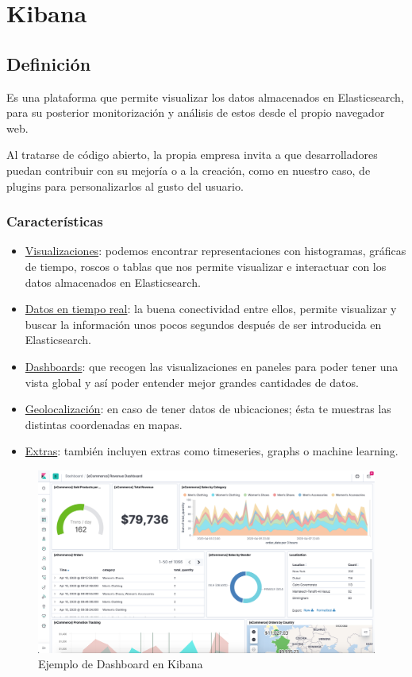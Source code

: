 \documentclass[a4paper, 12pt]{book}
\begin{document}
\section{Kibana}
\label{sec:Kibana}
\subsection{Definición}
Es una plataforma que permite visualizar los datos almacenados en Elasticsearch, para su posterior monitorización y análisis de estos desde el propio navegador web\cite{srivastaba:_kibanaguide}.

Al tratarse de código abierto, la propia empresa invita a que desarrolladores puedan contribuir con su mejoría o a la creación, como en nuestro caso, de plugins para personalizarlos al gusto del usuario. 
\subsubsection{Características}
\begin{itemize}
\item \underline{Visualizaciones}: podemos encontrar representaciones con histogramas, gráficas de tiempo, roscos o tablas que nos permite visualizar e interactuar con los datos almacenados en Elasticsearch.
\item \underline{Datos en tiempo real}: la buena conectividad entre ellos, permite visualizar y buscar la información unos pocos segundos después de ser introducida en Elasticsearch.
\item \underline{Dashboards}: que recogen las visualizaciones en paneles para poder tener una vista global y así poder entender mejor grandes cantidades de datos.
\item \underline{Geolocalización}: en caso de tener datos de ubicaciones; ésta te muestras las distintas coordenadas en mapas.
\item \underline{Extras}: también incluyen extras como timeseries, graphs o machine learning.
\end{itemize}

\begin{figure}[H]
  \centering
  \includegraphics[width=12cm, keepaspectratio]{img/development/kibana-dashboard.png}
  \caption{Ejemplo de Dashboard en Kibana}
  \label{fig:kibanaexample}
\end{figure}
\end{document}
